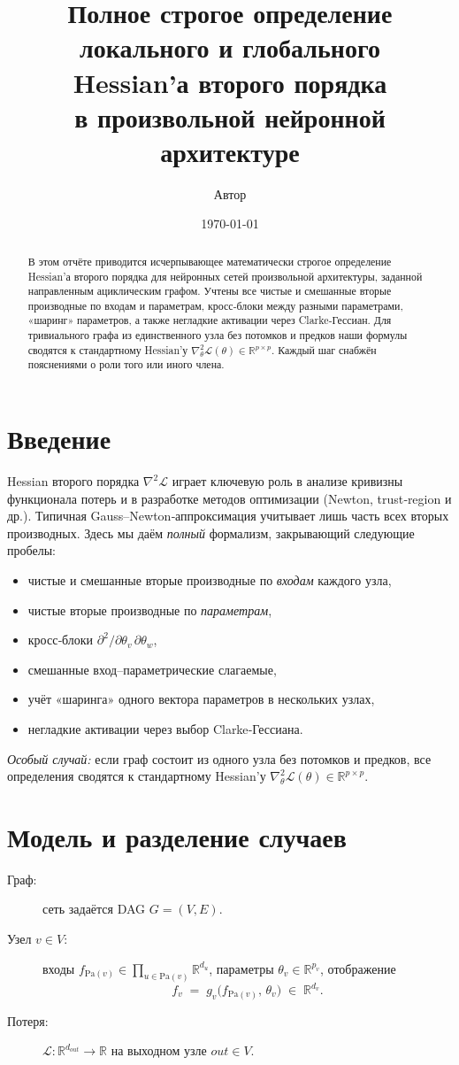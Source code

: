 \documentclass[a4paper,12pt]{article}
\title{Полное строгое определение локального и глобального \\ Hessian’а второго порядка \\ в произвольной
нейронной архитектуре}
\author{Автор}
\date{\today}
\newcommand{\Pa}{\mathrm{Pa}} %
\begin{document}
\sloppy
\maketitle

\begin{abstract}
  В этом отчёте приводится исчерпывающее математически строгое определение Hessian’а второго порядка для
  нейронных сетей произвольной архитектуры, заданной направленным ациклическим графом. Учтены все чистые и
  смешанные вторые производные по входам и параметрам, кросс‐блоки между разными параметрами, «шаринг»
  параметров, а также негладкие активации через Clarke‐Гессиан. Для тривиального графа из единственного узла
  без потомков и предков наши формулы сводятся к стандартному Hessian’у $\nabla^2_\theta\mathcal
  L(\theta)\in\mathbb{R}^{p\times p}$. Каждый шаг снабжён пояснениями о роли того или иного члена.
\end{abstract}

\tableofcontents
\bigskip

\section{Введение}
Hessian второго порядка $\nabla^2\mathcal L$ играет ключевую роль в анализе кривизны функционала потерь и в
разработке методов оптимизации (Newton, trust‐region и др.). Типичная Gauss–Newton‐аппроксимация учитывает
лишь часть всех вторых производных. Здесь мы даём \emph{полный} формализм, закрывающий следующие пробелы:
\begin{itemize}
  \item чистые и смешанные вторые производные по \emph{входам} каждого узла,
  \item чистые вторые производные по \emph{параметрам},
  \item кросс‐блоки $\partial^2/\partial\theta_v\,\partial\theta_w$,
  \item смешанные вход–параметрические слагаемые,
  \item учёт «шаринга» одного вектора параметров в нескольких узлах,
  \item негладкие активации через выбор Clarke‐Гессиана.
\end{itemize}
\emph{Особый случай:} если граф состоит из одного узла без потомков и предков, все определения сводятся к
стандартному Hessian’у $\nabla^2_\theta\mathcal L(\theta)\in\mathbb{R}^{p\times p}$.

\section{Модель и разделение случаев}
\begin{description}
  \item[Граф:] сеть задаётся DAG $G=(V,E)$.
  \item[Узел $v\in V$:] входы $f_{\Pa(v)}\in\prod_{u\in\Pa(v)}\mathbb{R}^{d_u}$, параметры
    $\theta_v\in\mathbb{R}^{p_v}$, отображение
    \[
      f_v \;=\; g_v\bigl(f_{\Pa(v)},\,\theta_v\bigr)\;\in\;\mathbb{R}^{d_v}.
    \]
  \item[Потеря:] $\mathcal L:\mathbb{R}^{d_{out}}\to\mathbb{R}$ на выходном узле $out\in V$.
\end{description}
\end{document}
